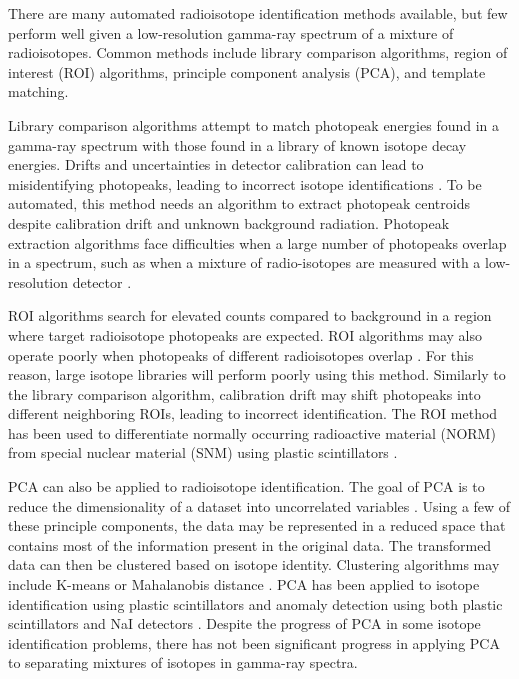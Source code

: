 There are many automated radioisotope identification methods available, but few perform well given a low-resolution gamma-ray spectrum of a mixture of radioisotopes. Common methods include library comparison algorithms, region of interest (ROI) algorithms, principle component analysis (PCA), and template matching.

Library comparison algorithms attempt to match photopeak energies found in a gamma-ray spectrum with those found in a library of known isotope decay energies. Drifts and uncertainties in detector calibration can lead to misidentifying photopeaks, leading to incorrect isotope identifications \cite{burr2009}. To be automated, this method needs an algorithm to extract photopeak centroids despite calibration drift and unknown background radiation. Photopeak extraction algorithms face difficulties when a large number of photopeaks overlap in a spectrum, such as when a mixture of radio-isotopes are measured with a low-resolution detector \cite{xiong2015}.

ROI algorithms search for elevated counts compared to background in a region where target radioisotope photopeaks are expected. ROI algorithms may also operate poorly when photopeaks of different radioisotopes overlap \cite{burr2009}. For this reason, large isotope libraries will perform poorly using this method. Similarly to the library comparison algorithm, calibration drift may shift photopeaks into different neighboring ROIs, leading to incorrect identification. The ROI method has been used to differentiate normally occurring radioactive material (NORM) from special nuclear material (SNM) using plastic scintillators \cite{Ely2006}.

PCA can also be applied to radioisotope identification. The goal of PCA is to reduce the dimensionality of a dataset into uncorrelated variables \cite{Jolliffe2002}. Using a few of these principle components, the data may be represented in a reduced space that contains most of the information present in the original data. The transformed data can then be clustered based on isotope identity. Clustering algorithms may include K-means or Mahalanobis distance \cite{Kanungo2002, Kumari2012}. PCA has been applied to isotope identification using plastic scintillators \cite{Boardman2012} and anomaly detection using both plastic scintillators and NaI detectors \cite{runkle2006b}. Despite the progress of PCA in some isotope identification problems, there has not been significant progress in applying PCA to separating mixtures of isotopes in gamma-ray spectra.

